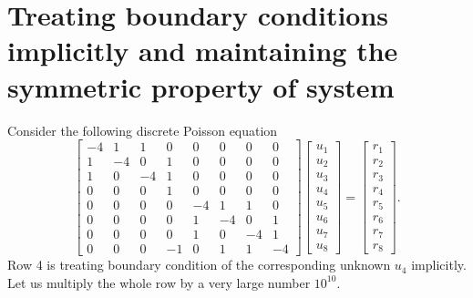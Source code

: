 \documentclass{article}
\numberwithin{equation}{section}
\begin{document}
\section{Treating boundary conditions implicitly and maintaining the symmetric property of system}
Consider the following discrete Poisson equation 
\begin{equation}
\left[
\begin{array}{ccc|c|cccc}
-4 & 1 & 1 & 0 & 0 & 0 & 0 & 0 \\
1 & -4 & 0 & 1 & 0 & 0 & 0 & 0 \\
1 & 0 & -4 & 1 & 0 & 0 & 0 & 0 \\
\hline
0 & 0 & 0 & 1 & 0 & 0 & 0 & 0 \\
\hline
0 & 0 & 0 & 0 & -4 & 1 & 1 & 0 \\
0 & 0 & 0 & 0 & 1 & -4 & 0 & 1 \\
0 & 0 & 0 & 0 & 1 & 0 & -4 & 1 \\
0 & 0 & 0 & -1 & 0 & 1 & 1 & -4
\end{array}
\right]
\left[
\begin{array}{c}
u_1\\
u_2\\
u_3\\
u_4\\
u_5\\
u_6\\
u_7\\
u_8
\end{array}
\right]
=\left[
\begin{array}{c}
r_1\\
r_2\\
r_3\\
r_4\\
r_5\\
r_6\\
r_7\\
r_8
\end{array}
\right].
\end{equation}
Row 4 is treating boundary condition of the corresponding unknown $u_4$ implicitly. Let us multiply the whole row by a very large number $10^{10}$.
\end{document}
